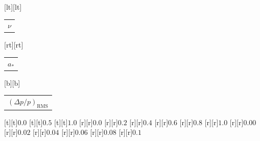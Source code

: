 %    
%
%
\begin{psfrags}%
\psfragscanon%
%
[lt][lt]{\color[rgb]{0,0,0}\setlength{\tabcolsep}{0pt}\begin{tabular}{l}{\Large$\nu$}\end{tabular}}%
[rt][rt]{\color[rgb]{0,0,0}\setlength{\tabcolsep}{0pt}\begin{tabular}{r}{\Large$a_\ast$}\end{tabular}}%
[b][b]{\color[rgb]{0,0,0}\setlength{\tabcolsep}{0pt}\begin{tabular}{c}{\Large$(\Delta p/p)_{\mathrm{RMS}}$}\end{tabular}}%
%
[t][t]{$0.0$}%
[t][t]{$0.5$}%
[t][t]{$1.0$}%
%
[r][r]{$0.0$}%
[r][r]{$0.2$}%
[r][r]{$0.4$}%
[r][r]{$0.6$}%
[r][r]{$0.8$}%
[r][r]{$1.0$}%
%
[r][r]{$0.00$}%
[r][r]{$0.02$}%
[r][r]{$0.04$}%
[r][r]{$0.06$}%
[r][r]{$0.08$}%
[r][r]{$0.1$}%
%
%
\end{psfrags}%
%
